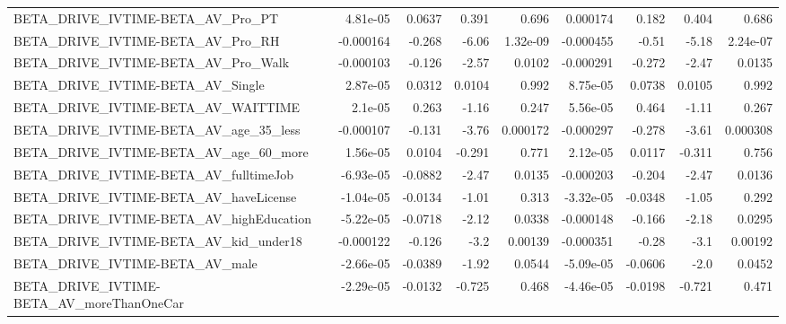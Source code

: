 \begin{tabular}{lrrrrrrrr}
BETA\_DRIVE\_IVTIME-BETA\_AV\_Pro\_PT                   &    4.81e-05 &       0.0637 &    0.391 &    0.696 &   0.000174 &       0.182 &        0.404 &         0.686 \\
BETA\_DRIVE\_IVTIME-BETA\_AV\_Pro\_RH                   &   -0.000164 &       -0.268 &    -6.06 & 1.32e-09 &  -0.000455 &       -0.51 &        -5.18 &      2.24e-07 \\
BETA\_DRIVE\_IVTIME-BETA\_AV\_Pro\_Walk                 &   -0.000103 &       -0.126 &    -2.57 &   0.0102 &  -0.000291 &      -0.272 &        -2.47 &        0.0135 \\
BETA\_DRIVE\_IVTIME-BETA\_AV\_Single                   &    2.87e-05 &       0.0312 &   0.0104 &    0.992 &   8.75e-05 &      0.0738 &       0.0105 &         0.992 \\
BETA\_DRIVE\_IVTIME-BETA\_AV\_WAITTIME                 &     2.1e-05 &        0.263 &    -1.16 &    0.247 &   5.56e-05 &       0.464 &        -1.11 &         0.267 \\
BETA\_DRIVE\_IVTIME-BETA\_AV\_age\_35\_less              &   -0.000107 &       -0.131 &    -3.76 & 0.000172 &  -0.000297 &      -0.278 &        -3.61 &      0.000308 \\
BETA\_DRIVE\_IVTIME-BETA\_AV\_age\_60\_more              &    1.56e-05 &       0.0104 &   -0.291 &    0.771 &   2.12e-05 &      0.0117 &       -0.311 &         0.756 \\
BETA\_DRIVE\_IVTIME-BETA\_AV\_fulltimeJob              &   -6.93e-05 &      -0.0882 &    -2.47 &   0.0135 &  -0.000203 &      -0.204 &        -2.47 &        0.0136 \\
BETA\_DRIVE\_IVTIME-BETA\_AV\_haveLicense              &   -1.04e-05 &      -0.0134 &    -1.01 &    0.313 &  -3.32e-05 &     -0.0348 &        -1.05 &         0.292 \\
BETA\_DRIVE\_IVTIME-BETA\_AV\_highEducation            &   -5.22e-05 &      -0.0718 &    -2.12 &   0.0338 &  -0.000148 &      -0.166 &        -2.18 &        0.0295 \\
BETA\_DRIVE\_IVTIME-BETA\_AV\_kid\_under18              &   -0.000122 &       -0.126 &     -3.2 &  0.00139 &  -0.000351 &       -0.28 &         -3.1 &       0.00192 \\
BETA\_DRIVE\_IVTIME-BETA\_AV\_male                     &   -2.66e-05 &      -0.0389 &    -1.92 &   0.0544 &  -5.09e-05 &     -0.0606 &         -2.0 &        0.0452 \\
BETA\_DRIVE\_IVTIME-BETA\_AV\_moreThanOneCar           &   -2.29e-05 &      -0.0132 &   -0.725 &    0.468 &  -4.46e-05 &     -0.0198 &       -0.721 &         0.471 \\

\end{tabular}
